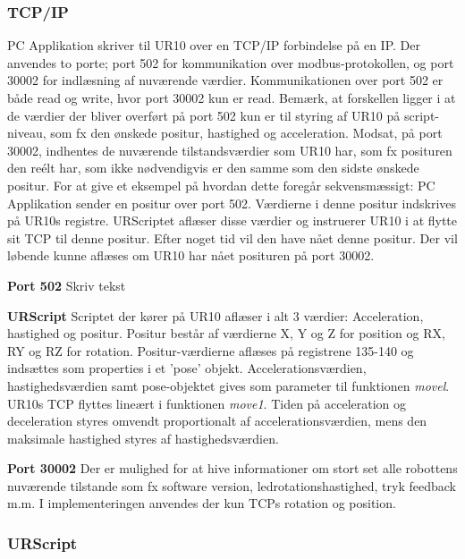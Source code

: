\subsubsection{TCP/IP}
PC Applikation skriver til UR10 over en TCP/IP forbindelse på en IP. Der anvendes to porte; port 502 for kommunikation over modbus-protokollen, og port 30002 for indlæsning af nuværende værdier.
Kommunikationen over port 502 er både read og write, hvor port 30002 kun er read. 
Bemærk, at forskellen  ligger i at de værdier der bliver overført på port 502 kun er til styring af UR10 på script-niveau, som fx den ønskede positur, hastighed og acceleration. Modsat, på port 30002, indhentes de nuværende tilstandsværdier som UR10 har, som fx posituren den reélt har, som ikke nødvendigvis er den samme som den sidste ønskede positur.
For at give et eksempel på hvordan dette foregår sekvensmæssigt:
PC Applikation sender en positur over port 502. Værdierne i denne positur indskrives på UR10s registre.
URScriptet aflæser disse værdier og instruerer UR10 i at flytte sit TCP til denne positur.
Efter noget tid vil den have nået denne positur. Der vil løbende kunne aflæses om UR10 har nået posituren på port 30002.

\textbf{Port 502}
Skriv tekst

\textbf{URScript}
Scriptet der kører på UR10 aflæser i alt 3 værdier:
Acceleration, hastighed og positur.
Positur består af værdierne X, Y og Z for position og RX, RY og RZ for rotation.
Positur-værdierne aflæses på registrene 135-140 og indsættes som properties i et 'pose' objekt.
Accelerationsværdien, hastighedsværdien samt pose-objektet gives som parameter til funktionen \textit{movel}.
UR10s TCP flyttes lineært i funktionen \textit{move1}. Tiden på acceleration og deceleration styres omvendt proportionalt af accelerationsværdien, mens den maksimale hastighed styres af hastighedsværdien.

\textbf{Port 30002}
Der er mulighed for at hive informationer om stort set alle robottens nuværende tilstande som fx software version, ledrotationshastighed, tryk feedback m.m. I implementeringen anvendes der kun TCPs rotation og position.

\subsubsection{URScript}

